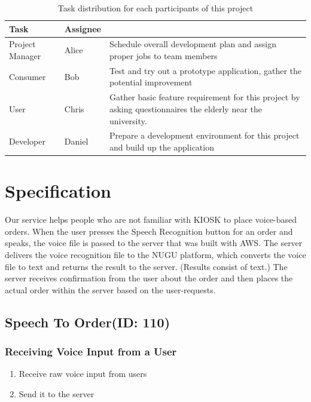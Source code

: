 \documentclass[conference,compsoc]{IEEEtran}
\begin{document}
\begin{table}[ht!] \renewcommand\arraystretch{1.25}
  \begin{threeparttable}
      \caption{Task distribution  for each participants of this project%
      \label{tab:table1}}    %
      \begin{tabular}{@{}l l>{\raggedright\arraybackslash}p{4.7cm}@{}}
      \toprule
      \bfseries Task & \bfseries Assignee & \multicolumn{1}{l}{\bfseries Description} \\
      \midrule
      Project Manager & Alice & Schedule overall development plan and assign proper jobs to team members \\ 
      Consumer & Bob & Test and try out a prototype application, gather the potential improvement \\ 
      User & Chris & Gather basic feature requirement for this project by asking questionnaires the elderly near the university. \\ 
      Developer & Daniel & Prepare a development environment for this project and build up the application \\
      \bottomrule
      \end{tabular}
  \end{threeparttable}
\end{table}

\section{Specification}
Our service helps people who are not familiar with KIOSK to place voice-based orders. When the user presses the Speech Recognition button for an order and speaks, the voice file is passed to the server that was built with AWS. The server delivers the voice recognition file to the NUGU platform, which converts the voice file to text and returns the result to the server. (Results consist of text.) The server receives confirmation from the user about the order and then places the actual order within the server based on the user-requests.

\subsection{Speech To Order(ID: 110)}
\subsubsection{Receiving Voice Input from a User}
\begin{enumerate}
  \item Receive raw voice input from users
  \item Send it to the server
\end{enumerate}
\end{document}
